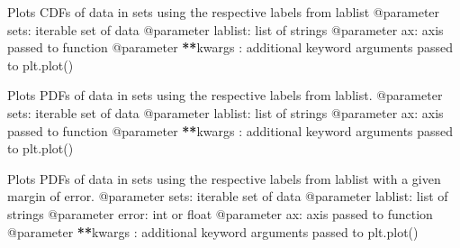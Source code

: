 \documentclass[letterpaper,10pt,english]{sphinxmanual}
\begin{document}

\begin{fulllineitems}
\label{\detokenize{index:windtunnel.plotcdfs}}
Plots CDFs of data in sets using the respective labels from lablist
@parameter sets: iterable set of data
@parameter lablist: list of strings
@parameter ax: axis passed to function
@parameter {\color{red}\bfseries{}**}kwargs : additional keyword arguments passed to plt.plot()

\end{fulllineitems}


\begin{fulllineitems}
\label{\detokenize{index:windtunnel.plotpdfs}}
Plots PDFs of data in sets using the respective labels from lablist.
@parameter sets: iterable set of data
@parameter lablist: list of strings
@parameter ax: axis passed to function
@parameter {\color{red}\bfseries{}**}kwargs : additional keyword arguments passed to plt.plot()

\end{fulllineitems}


\begin{fulllineitems}
\label{\detokenize{index:windtunnel.plotpdfs_err}}
Plots PDFs of data in sets using the respective labels from lablist with
a given margin of error.
@parameter sets: iterable set of data
@parameter lablist: list of strings
@parameter error: int or float
@parameter ax: axis passed to function
@parameter {\color{red}\bfseries{}**}kwargs : additional keyword arguments passed to plt.plot()

\end{fulllineitems}

\end{document}
